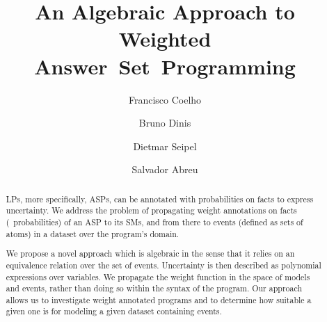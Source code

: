 \documentclass[x11names]{tlp}
\begin{document}

\title{%
	An Algebraic Approach to Weighted
	Answer~Set~Programming
}
\ifTLP

	\begin{authgrp}
		\author{ }

		\author{ }

		\author{ }

		\author{ }
	\end{authgrp}
\else
	\author{%
		Francisco Coelho   \and %
		Bruno Dinis        \and %
		Dietmar Seipel       \and %
		Salvador Abreu     %
	}
\fi

\maketitle

\begin{abstract}
	\Aclp{LP}, more specifically, \aclp*{ASP}, can be annotated with probabilities on facts to express uncertainty.
	We address the 	problem of propagating weight annotations on facts (\eg\ probabilities) of an \acl*{ASP} to its \aclp*{SM}, and from there to events (defined as sets of atoms) in a dataset over the program's domain. %

	We propose a novel approach which is algebraic in the sense that it relies on an equivalence relation over the set of events.
	Uncertainty is then described as polynomial expressions over variables.
	We propagate the weight function in the space of models and events, rather than doing so within the syntax of the program.
	Our approach allows us to investigate weight annotated programs and to determine how suitable a given one is for modeling a given dataset containing events.
\end{abstract}
\end{document}
